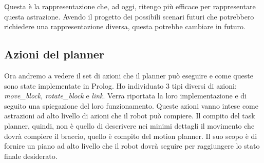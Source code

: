 Questa è la rappresentazione che, ad oggi, ritengo più efficace per rappresentare questa astrazione. Avendo il progetto dei possibili scenari futuri che potrebbero richiedere una rappresentazione diversa, questa potrebbe cambiare in futuro.
\subsection{Azioni del planner}
\label{subsec:azioniplanner}
Ora andremo a vedere il set di azioni che il planner può eseguire e come queste sono state implementate in Prolog. Ho individuato 3 tipi diversi di azioni:
\textit{move\_block}, \textit{rotate\_block} e \textit{link}. Verra riportata la loro implementazione e di seguito una spiegazione del loro funzionamento.
Queste azioni vanno intese come astrazioni ad alto livello di azioni che il robot può compiere. Il compito del task planner, quindi, non è quello di descrivere nei minimi dettagli il movimento che dovrà compiere il braccio, quello è compito del motion planner.
Il suo scopo è di fornire un piano ad alto livello che il robot dovrà seguire per raggiungere lo stato finale desiderato.

